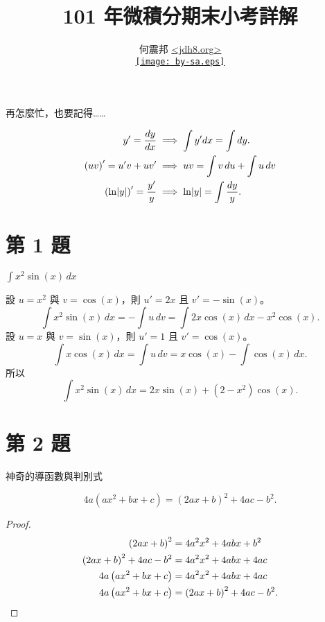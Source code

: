 \documentclass{beamer}
\title[期末小考]{101 年微積分期末小考詳解}
\author[何震邦]{何震邦 \href{http://jdh8.org/}{\textless jdh8.org\textgreater}\\
    \href{http://creativecommons.org/licenses/by-sa/3.0/tw/deed.zh\textunderscore TW}{\texttt{[image: by-sa.eps]}}}
\newcommand{\Left} {\mathopen{}\mathclose\bgroup\left}
\newcommand{\Right}{\aftergroup\egroup\right}
\theoremstyle{remark}
\begin{document}
\begin{CJK}{UTF8}{bsmi}
\maketitle

\begin{frame}{再怎麼忙，也要記得\dots\dots}
  \begin{theorem}
    \begin{align*}
      y' = \frac{dy}{dx} &\implies \int y'dx = \int dy.\\
      \left( uv \right)' = u'v + uv' &\implies uv = \int v\,du + \int u\,dv\\
      \left( \ln \Left| y \Right| \right)' = \frac{y'}{y} &\implies \ln \Left| y \Right| = \int \frac{dy}{y}.
    \end{align*}
  \end{theorem}
\end{frame}

\section{第 1 題}
\begin{frame}{$\displaystyle \int x^2 \sin(x)\,dx$}
  \begin{solution}
    設 $u = x^2$ 與 $v = \cos(x)$，則 $u' = 2x$ 且 $v' = -\sin(x)$。
    \[\int x^2 \sin(x)\,dx = -\int u\,dv = \int 2x \cos(x)\,dx - x^2 \cos(x).\]
    設 $u = x$ 與 $v = \sin(x)$，則 $u' = 1$ 且 $v' = \cos(x)$。
    \[\int x \cos(x)\,dx = \int u\,dv = x \cos(x) - \int \cos(x)\,dx.\]
    所以
    \[\int x^2 \sin(x)\,dx = 2x \sin(x) + \left( 2 - x^2 \right) \cos(x).\]
  \end{solution}
\end{frame}

\section{第 2 題}
\begin{frame}{神奇的導函數與判別式}
  \begin{theorem}
    \[4a \left( ax^2 + bx + c \right) = \left( 2ax + b \right)^2 + 4ac - b^2.\]
    \begin{proof}
      \begin{align*}
	\left( 2ax + b \right)^2 &= 4a^2 x^2 + 4abx + b^2\\
	\left( 2ax + b \right)^2 + 4ac - b^2 &= 4a^2 x^2 + 4abx + 4ac\\
	4a \left( ax^2 + bx + c \right) &= 4a^2 x^2 + 4abx + 4ac\\
	4a \left( ax^2 + bx + c \right) &= \left( 2ax + b \right)^2 + 4ac - b^2.\qedhere
      \end{align*}
    \end{proof}
  \end{theorem}
\end{frame}


\end{CJK}
\end{document}
